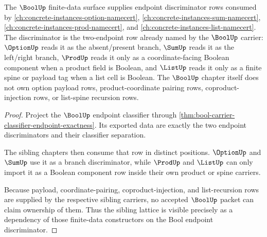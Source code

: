 \begin{theorem}
\label{thm:bool-finite-data-sibling-lattice-integrity}
The $\BoolUp$ finite-data surface supplies endpoint discriminator rows consumed by \autoref{ch:concrete-instances-option-namecert}, \autoref{ch:concrete-instances-sum-namecert}, \autoref{ch:concrete-instances-prod-namecert}, and \autoref{ch:concrete-instances-list-namecert}. The discriminator is the two-endpoint row already named by the $\BoolUp$ carrier: $\OptionUp$ reads it as the absent/present branch, $\SumUp$ reads it as the left/right branch, $\ProdUp$ reads it only as a coordinate-facing Boolean component when a product field is Boolean, and $\ListUp$ reads it only as a finite spine or payload tag when a list cell is Boolean. The $\BoolUp$ chapter itself does not own option payload rows, product-coordinate pairing rows, coproduct-injection rows, or list-spine recursion rows.
\end{theorem}
\begin{proof}
Project the $\BoolUp$ endpoint classifier through \autoref{thm:bool-carrier-classifier-endpoint-exactness}. Its exported data are exactly the two endpoint discriminators and their classifier separation.

The sibling chapters then consume that row in distinct positions. $\OptionUp$ and $\SumUp$ use it as a branch discriminator, while $\ProdUp$ and $\ListUp$ can only import it as a Boolean component row inside their own product or spine carriers.

Because payload, coordinate-pairing, coproduct-injection, and list-recursion rows are supplied by the respective sibling carriers, no accepted $\BoolUp$ packet can claim ownership of them. Thus the sibling lattice is visible precisely as a dependency of those finite-data constructors on the Bool endpoint discriminator.
\end{proof}
